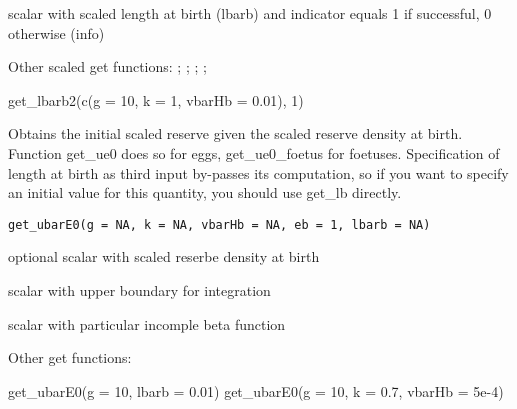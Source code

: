 \documentclass[a4paper]{book}
\begin{document}
%
\begin{Value}
scalar with scaled length at birth (lbarb) and indicator equals 1 if successful, 0 otherwise (info)
\end{Value}
%
\begin{SeeAlso}\relax
Other scaled get functions: ;
; ;
;
\end{SeeAlso}
%
\begin{Examples}
\begin{ExampleCode}
get_lbarb2(c(g = 10, k = 1, vbarHb = 0.01), 1)
\end{ExampleCode}
\end{Examples}
%
\begin{Description}\relax
Obtains the initial scaled reserve given the scaled reserve density at birth.
Function get\_ue0 does so for eggs, get\_ue0\_foetus for foetuses.
Specification of length at birth as third input by-passes its computation,
so if you want to specify an initial value for this quantity, you should use get\_lb directly.
\end{Description}
%
\begin{Usage}
\begin{verbatim}
get_ubarE0(g = NA, k = NA, vbarHb = NA, eb = 1, lbarb = NA)
\end{verbatim}
\end{Usage}
%
\begin{Arguments}
\begin{ldescription}
\item[\code{eb:}] optional scalar with scaled reserbe density at birth

\item[\code{x1}] scalar with upper boundary for integration
\end{ldescription}
\end{Arguments}
%
\begin{Value}
scalar with particular incomple beta function
\end{Value}
%
\begin{SeeAlso}\relax
Other get functions: 
\end{SeeAlso}
%
\begin{Examples}
\begin{ExampleCode}
get_ubarE0(g = 10, lbarb = 0.01)
get_ubarE0(g = 10, k = 0.7, vbarHb = 5e-4)
\end{ExampleCode}
\end{Examples}
\end{document}
